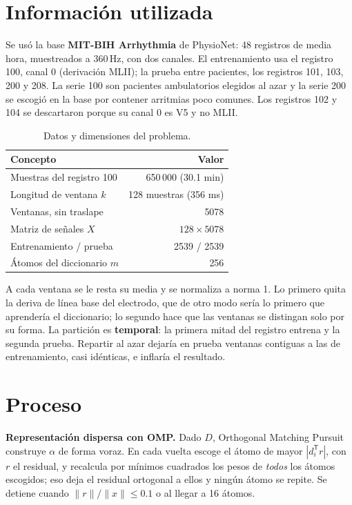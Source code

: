 \documentclass[11pt,letterpaper]{article}
\newcommand{\T}{^{\mathsf{T}}}
\begin{document}
\section{Información utilizada}

Se usó la base \textbf{MIT-BIH Arrhythmia} de PhysioNet: 48 registros
de media hora, muestreados a 360\,Hz, con dos canales. El
entrenamiento usa el registro 100, canal 0 (derivación MLII); la
prueba entre pacientes, los registros 101, 103, 200 y 208. La serie
100 son pacientes ambulatorios elegidos al azar y la serie 200 se
escogió en la base por contener arritmias poco comunes. Los registros
102 y 104 se descartaron porque su canal 0 es V5 y no MLII.

\begin{table}[H]
  \centering
  \begin{tabular}{lr}
    \toprule
    \textbf{Concepto} & \textbf{Valor} \\
    \midrule
    Muestras del registro 100            & 650\,000 (30.1 min) \\
    Longitud de ventana $k$              & 128 muestras (356 ms) \\
    Ventanas, sin traslape               & 5078 \\
    Matriz de señales $X$                & $128 \times 5078$ \\
    Entrenamiento / prueba               & 2539 / 2539 \\
    Átomos del diccionario $m$           & 256 \\
    \bottomrule
  \end{tabular}
  \caption{Datos y dimensiones del problema.}
  \label{tab:datos}
\end{table}

A cada ventana se le resta su media y se normaliza a norma 1. Lo
primero quita la deriva de línea base del electrodo, que de otro modo
sería lo primero que aprendería el diccionario; lo segundo hace que
las ventanas se distingan solo por su forma. La partición es
\textbf{temporal}: la primera mitad del registro entrena y la segunda
prueba. Repartir al azar dejaría en prueba ventanas contiguas a las de
entrenamiento, casi idénticas, e inflaría el resultado.

\section{Proceso}

\textbf{Representación dispersa con OMP.} Dado $D$, Orthogonal
Matching Pursuit construye $\alpha$ de forma voraz. En cada vuelta
escoge el átomo de mayor $|d_i\T r|$, con $r$ el residual, y recalcula
por mínimos cuadrados los pesos de \emph{todos} los átomos escogidos;
eso deja el residual ortogonal a ellos y ningún átomo se repite. Se
detiene cuando $\|r\| / \|x\| \le 0.1$ o al llegar a 16 átomos.
\end{document}
